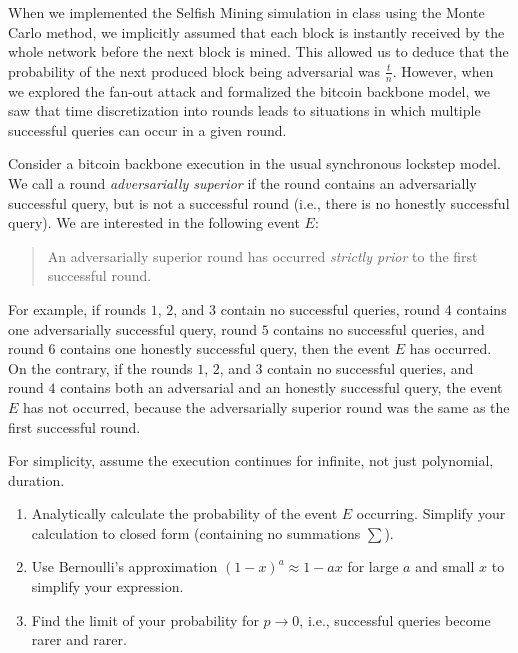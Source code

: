 \begin{problems}
    \item When we implemented the Selfish Mining simulation in class using the
          Monte Carlo method, we implicitly assumed that each block is instantly
          received by the whole network before the next block is mined. This
          allowed us to deduce that the probability of the next produced block
          being adversarial was $\frac{t}{n}$. However, when we explored the
          fan-out attack and formalized the bitcoin backbone model, we saw that
          time discretization into rounds leads to situations in which multiple
          successful queries can occur in a given round.

          Consider a bitcoin backbone execution in the usual synchronous
          lockstep model. We call a round \emph{adversarially superior} if the
          round contains an adversarially successful query, but is not a
          successful round (i.e., there is no honestly successful query). We are
          interested in the following event $E$:

          \begin{quote}
            An adversarially superior round has occurred \emph{strictly prior}
            to the first successful round.
          \end{quote}

          For example, if rounds $1$, $2$, and $3$ contain no successful
          queries, round $4$ contains one adversarially successful query, round
          $5$ contains no successful queries, and round $6$ contains one
          honestly successful query, then the event $E$ has occurred. On the
          contrary, if the rounds $1$, $2$, and $3$ contain no successful
          queries, and round $4$ contains both an adversarial and an honestly
          successful query, the event $E$ has not occurred, because the
          adversarially superior round was the same as the first successful
          round.

          For simplicity, assume the execution continues for infinite, not just
          polynomial, duration.

          \begin{enumerate}
            \item Analytically calculate the probability of the event $E$
                  occurring. Simplify your calculation to closed form
                  (containing no summations $\sum$).
            \item Use Bernoulli's approximation $(1 - x)^a \approx 1 - ax$ for
                  large $a$ and small $x$ to simplify your expression.
            \item Find the limit of your probability for $p \to 0$, i.e.,
                  successful queries become rarer and rarer.
          \end{enumerate}
\end{problems}
